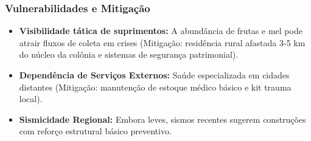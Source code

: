 \subsubsection{Vulnerabilidades e
Mitigação}

\begin{itemize}
\tightlist
\item
  \textbf{Visibilidade tática de suprimentos:} A abundância de frutas e
  mel pode atrair fluxos de coleta em crises (Mitigação: residência
  rural afastada 3-5 km do núcleo da colônia e sistemas de segurança
  patrimonial).
\item
  \textbf{Dependência de Serviços Externos:} Saúde especializada em
  cidades distantes (Mitigação: manutenção de estoque médico básico e
  kit trauma local).
\item
  \textbf{Sismicidade Regional:} Embora leves, sismos recentes sugerem
  construções com reforço estrutural básico preventivo.
\end{itemize}

